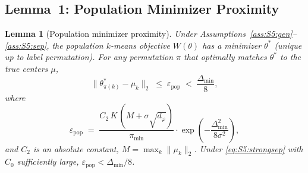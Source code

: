 \documentclass[twoside]{article}
\theoremstyle{plain}
\newtheorem{lemma}[theorem]{Lemma}
\theoremstyle{definition}
\theoremstyle{remark}
\newcommand{\1}{\mathbf{1}}
\renewcommand{\epsilon}{\varepsilon}
\renewcommand{\phi}{\varphi}
\newcommand{\muk}{\mu_k}
\newcommand{\norm}[1]{\lVert#1\rVert}
\begin{document}
\subsection{Lemma~1: Population Minimizer Proximity}
\label{sec:S5:lem1}

\begin{lemma}[Population minimizer proximity]
\label{lem:S5:pop}
Under Assumptions~\ref{ass:S5:gen}--\ref{ass:S5:sep}, the population
$k$-means objective $W(\theta)$ has a minimizer $\theta^*$ (unique up
to label permutation).  For any permutation $\pi$ that optimally matches
$\theta^*$ to the true centers $\mu$,
\[
\norm{\theta^*_{\pi(k)}-\muk}_2 \;\le\; \epsilon_{\mathrm{pop}}
\;<\; \frac{\Delta_{\min}}{8},
\]
where
\[
\epsilon_{\mathrm{pop}} \;=\;
\frac{C_2\,K\,(M+\sigma\sqrt{d_\phi})}{\pi_{\min}}
\cdot \exp\!\left(-\frac{\Delta_{\min}^2}{8\sigma^2}\right),
\]
and $C_2$ is an absolute constant, $M=\max_k\norm{\muk}_2$.
Under \eqref{eq:S5:strongsep} with $C_0$ sufficiently large,
$\epsilon_{\mathrm{pop}}<\Delta_{\min}/8$.
\end{lemma}
\end{document}
